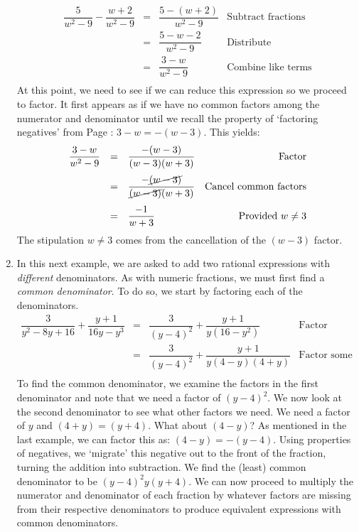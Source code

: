 \begin{ex}
\begin{enumerate}
\[\begin{array}{rclr}
\dfrac{5}{w^2 - 9} - \dfrac{w+2}{w^2-9} & = & \dfrac{5 - (w+2)}{w^2 - 9}& \text{Subtract fractions}\\ [13pt]
                                        & = & \dfrac{5 - w - 2}{w^2-9} & \text{Distribute} \\ [13pt]
																				& = & \dfrac{3-w}{w^2-9} & \text{Combine like terms} \\ \end{array}\]
At this point, we need to see if we can reduce this expression so we proceed to factor.  It first appears as if we have no common factors among the numerator and denominator until we recall the property of `factoring negatives' from Page \pageref{propertiesofnegatives}:  $3-w = -(w-3)$. This yields:\[ \begin{array}{rclr}

\dfrac{3-w}{w^2-9} & = & \dfrac{-(w-3)}{(w-3)(w+3)} & \text{Factor} \\ [13pt]
                   & = & \dfrac{-\cancel{(w-3)}}{\cancel{(w-3)}(w+3)} & \text{Cancel common factors} \\ [13pt]
									 & = & \dfrac{-1}{w+3} & \text{Provided $w \neq 3$} \\ 
									\end{array}\]
The stipulation $w \neq 3$ comes from the cancellation of the $(w-3)$ factor.

\item  	In this next example, we are asked to add two rational expressions with \textit{different} denominators.  As with numeric fractions, we must first find a \textit{common denominator}. To do so, we start by factoring each of the denominators. \[ \begin{array}{rclr}

\dfrac{3}{y^2 - 8y + 16} + \dfrac{y+1}{16y - y^3} & = & \dfrac{3}{(y-4)^2} + \dfrac{y+1}{y(16 - y^2)} & \text{Factor} \\	[13pt]		
                                                  & = & \dfrac{3}{(y-4)^2} + \dfrac{y+1}{y(4-y)(4+y)} & \text{Factor some more} \\
																									
																									\end{array}\]
To find the common denominator, we examine the factors in the first denominator and note that we need a factor of $(y-4)^2$.  We now look at the second denominator to see what other factors we need. We need a factor of $y$ and $(4+y) = (y+4)$.  What about $(4-y)$?  As mentioned in the last example, we can factor this as: $(4-y) = -(y-4)$. Using properties of negatives, we `migrate' this negative out to the front of the fraction, turning the addition into subtraction.  We find the (least) common denominator to be $(y-4)^2 y (y+4)$.  We can now proceed to multiply the numerator and denominator of each fraction by whatever factors are missing from their respective denominators to produce equivalent expressions with common denominators. \[ \begin{array}{rclr}


\end{array}\]
\end{enumerate}
\end{ex}
